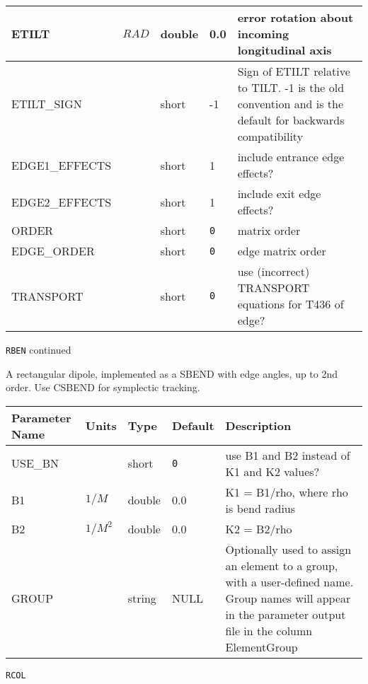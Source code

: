 \begin{tabular}{|l|l|l|l|p{\descwidth}|}
ETILT & $RAD$ & double &  0.0 & error rotation about incoming longitudinal axis  \\ \hline 
ETILT\_SIGN &  & short &   -1              & Sign of ETILT relative to TILT. -1 is the old convention and is the default for backwards compatibility  \\ \hline 
EDGE1\_EFFECTS &  & short &   1               & include entrance edge effects?  \\ \hline 
EDGE2\_EFFECTS &  & short &   1               & include exit edge effects?  \\ \hline 
ORDER &  & short &  \verb|0| & matrix order  \\ \hline 
EDGE\_ORDER &  & short &  \verb|0| & edge matrix order  \\ \hline 
TRANSPORT &  & short &  \verb|0| & use (incorrect) TRANSPORT equations for T436 of edge?  \\ \hline 
\end{tabular}

\newpage
\begin{center}{\Large\verb|RBEN| continued}\end{center}
A rectangular dipole, implemented as a SBEND with edge angles, up to 2nd order. Use CSBEND for symplectic tracking.
\\
\begin{tabular}{|l|l|l|l|p{\descwidth}|} \hline
Parameter Name & Units & Type & Default & Description \\ \hline 
USE\_BN &  & short &  \verb|0| & use B1 and B2 instead of K1 and K2 values?  \\ \hline 
B1 & $1/M$ & double &  0.0 & K1 = B1/rho, where rho is bend radius  \\ \hline 
B2 & $1/M^{2}$ & double &  0.0 & K2 = B2/rho  \\ \hline 
GROUP &  & string & NULL & Optionally used to assign an element to a group, with a user-defined name.  Group names will appear in the parameter output file in the column ElementGroup  \\ \hline 
\end{tabular}

\vspace*{0.5in}

\newpage
\begin{center}{\Large\verb|RCOL|}\end{center}
